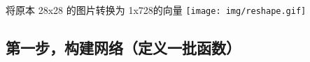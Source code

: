 \documentclass[11pt]{article}
\begin{document}
    \begin{center}
    \end{center}
    { \hspace*{\fill} \\}
    
    将原本 28x28 的图片转换为 1x728的向量 \texttt{[image: img/reshape.gif]}

    \hypertarget{ux7b2cux4e00ux6b65ux6784ux5efaux7f51ux7edcux5b9aux4e49ux4e00ux6279ux51fdux6570}{%
\subsection{第一步，构建网络（定义一批函数）}\label{ux7b2cux4e00ux6b65ux6784ux5efaux7f51ux7edcux5b9aux4e49ux4e00ux6279ux51fdux6570}}
\end{document}
